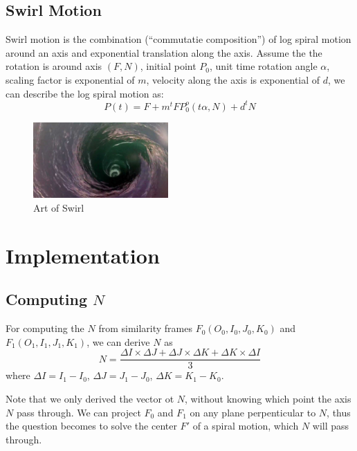 \documentclass[twoside,11pt]{article}
\begin{document}
\subsection{Swirl Motion}
Swirl motion is the combination (``commutatie composition'') of log spiral motion around an axis and exponential translation along the axis. Assume the the rotation is around axis $(F, N)$, initial point $P_0$, unit time rotation angle $\alpha$, scaling factor is exponential of $m$, velocity along the axis is exponential of $d$, we can describe the log spiral motion as:
\begin{equation}
P(t) = F + m^t FP_0^o(t\alpha, N) + d^t N
\end{equation}
\begin{figure}[h!]
  \centering
  \includegraphics[width=0.46\textwidth]{swirl}
  \caption{Art of Swirl}

\end{figure}

\section{Implementation}


\subsection{Computing $N$}

For computing the $N$ from similarity frames $F_0(O_0,I_0,J_0,K_0)$ and $F_1(O_1,I_1,J_1,K_1)$, we can derive $N$ as
\begin{equation}
N = \frac{\Delta I \times \Delta J + \Delta J \times \Delta K + \Delta K \times \Delta I}{3}
\end{equation}
where $\Delta I = I_1 - I_0$, $\Delta J = J_1 - J_0$, $\Delta K = K_1 - K_0$.

Note that we only derived the vector ot $N$, without knowing which point the axis $N$ pass through. We can project $F_0$ and $F_1$ on any plane perpenticular to $N$, thus the question becomes to solve the center $F'$ of a spiral motion, which $N$ will pass through.
\end{document}
